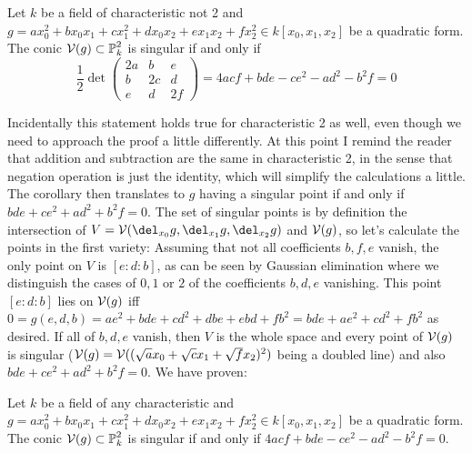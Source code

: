 \begin{corollary}
Let $k$ be a field of characteristic not 2 and $g =  ax_0^2 + bx_0x_1 + cx_1^2 + dx_0x_2 + ex_1x_2 + fx_2^2
\in k[x_0,x_1,x_2]$ be a quadratic form. The conic $\operatorname{\mathcal V}(g) \subset \operatorname{\mathbb P}^2_k$ is singular if and only if
\begin{equation}
\frac 12
\det
\begin{pmatrix}
2a & b & e \\
b & 2c & d \\
e & d & 2f
\end{pmatrix}
= 4acf + bde - ce^2 - ad^2 - b^2f = 0
\end{equation}
\end{corollary}

Incidentally this statement holds true for characteristic 2 as well, even though we need to approach the proof a little differently.
At this point I remind the reader that addition and subtraction are the same in characteristic 2, in the sense that negation operation is just the identity, which will simplify the calculations a little.
The corollary then translates to $g$ having a singular point if and only if $bde + ce^2 +ad^2 + b^2f = 0$.
The set of singular points is by definition the intersection of $V = \V(\del_{x_0}g,\del_{x_1}g,\del_{x_2}g)$ and $\operatorname{\mathcal V}(g)$, so let's calculate the points in the first variety: Assuming that not all coefficients $b,f,e$ vanish, the only point on $V$ is $[e:d:b]$, as can be seen by Gaussian elimination where we distinguish the cases of $0,1$ or $2$ of the coefficients $b,d,e$ vanishing.
This point $[e:d:b]$ lies on $\operatorname{\mathcal V}(g)$ iff $0 = g(e,d,b) = ae^2 + bde + cd^2 + dbe + ebd + fb^2 = bde + ae^2 + cd^2 + fb^2$ as desired.
If all of $b,d,e$ vanish, then $V$ is the whole space and every point of $\operatorname{\mathcal V}(g)$ is singular ($\operatorname{\mathcal V}(g) = \operatorname{\mathcal V}((\sqrt{a}x_0 + \sqrt{c}x_1 + \sqrt{f}x_2)^2)$ being a doubled line) and also $bde + ce^2 + ad^2 + b^2f = 0$. We have proven:

\begin{corollary}
Let $k$ be a field of any characteristic and $g = ax_0^2 + bx_0x_1 + cx_1^2 + dx_0x_2 + ex_1x_2 + fx_2^2
 \in k[x_0,x_1,x_2]$ be a quadratic form. The conic $\operatorname{\mathcal V}(g) \subset \operatorname{\mathbb P}^2_k$ is singular if and only if $4acf + bde - ce^2 - ad^2 - b^2f = 0$.
\end{corollary}


